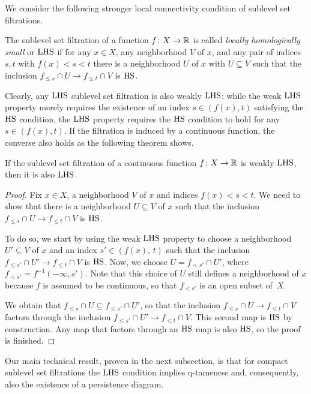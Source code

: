 We consider the following stronger local connectivity condition of sublevel set filtrations.

\begin{defi}
	The sublevel set filtration of a function $f \colon X \to \mathbb{R}$ is called \emph{locally homologically small} or \emph{$\mathrm{LHS}$} if for any $x \in X$, any neighborhood $V$ of $x$, and any pair of indices $s,t$ with $f(x) < s < t$ there is a neighborhood $U$ of $x$ with $U \subseteq V$ such that the inclusion $f_{\leq s} \cap U \to f_{\leq t} \cap V$ is $\mathrm{HS}$.
\end{defi}

Clearly, any $\mathrm{LHS}$ sublevel set filtration is also weakly $\mathrm{LHS}$:
while the weak $\mathrm{LHS}$ property merely requires the existence of an index $s \in (f(x),t)$ satisfying the $\mathrm{HS}$ condition, the $\mathrm{LHS}$ property requires the $\mathrm{HS}$ condition to hold for any $s \in (f(x),t)$.
If the filtration is induced by a continuous function, the converse also holds as the following theorem shows.

\begin{thm} \label{t:weak hlc to hlc}
	If the sublevel set filtration of a continuous function $f \colon X \to \mathbb{R}$ is weakly $\mathrm{LHS}$, then it is also $\mathrm{LHS}$.
\end{thm}

\begin{proof}
	Fix $x \in X$, a neighborhood $V$ of $x$ and indices $f(x) < s < t$.
	We need to show that there is a neighborhood $U \subseteq V$ of $x$ such that the inclusion $f_{\leq s} \cap U \to f_{\leq t} \cap V$ is $\mathrm{HS}$.

	To do so, we start by using the weak $\mathrm{LHS}$ property to choose a neighborhood $U' \subseteq V$ of $x$ and an index $s' \in (f(x),\, t)$ such that the inclusion $f_{\leq s'} \cap U' \to f_{\leq t} \cap V$ is $\mathrm{HS}$.
	Now, we choose $U = f_{< s'} \cap U'$, where $f_{< s'} = f^{-1} (-\infty, s')$.
	Note that this choice of $U$ still defines a neighborhood of $x$ because $f$ is assumed to be continuous, so that $f_{< s'}$ is an open subset of~$X$.

	We obtain that $f_{\leq s} \cap U \subseteq f_{\leq s'} \cap U'$, so that the inclusion $f_{\leq s} \cap U \to f_{\leq t} \cap V$ factors through the inclusion $f_{\leq s'} \cap U' \to f_{\leq t} \cap V$.
	This second map is $\mathrm{HS}$ by construction.
	Any map that factors through an $\mathrm{HS}$ map is also $\mathrm{HS}$, so the proof is finished.
\end{proof}

Our main technical result, proven in the next subsection, is that for compact sublevel set filtrations the $\mathrm{LHS}$ condition implies \mbox{q-tameness} and, consequently, also the existence of a persistence diagram.

